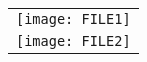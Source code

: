 \documentclass{article}
\begin{document}
\begin{figure}[!ht]
\begin{tabular}{ c }
\texttt{[image: FILE1]} \\[PADDINGpx] 
\texttt{[image: FILE2]}
\end{tabular}
\end{figure}
\end{document}
